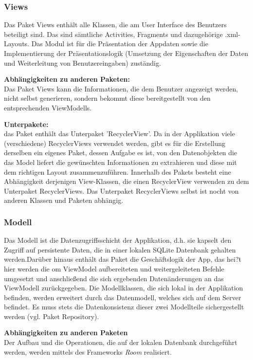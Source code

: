 \documentclass[11pt,a4paper]{report}
\begin{document}
\subsubsection{Views}
Das Paket Views enthält alle Klassen, die am User Interface des Benutzers beteiligt sind. Das sind sämtliche Activities, Fragments und dazugehörige .xml-Layouts. Das Modul ist für die Präsentation der Appdaten sowie die Implementierung der Präsentationslogik (Umsetzung der Eigenschaften der Daten und Weiterleitung von Benutzereingaben) zuständig.

\textbf{Abhängigkeiten zu anderen Paketen:}\\
Das Paket Views kann die Informationen, die dem Benutzer angezeigt werden, nicht selbst generieren, sondern bekommt diese bereitgestellt von den entsprechenden ViewModells.

\textbf{Unterpakete:}\\
das Paket enthält das Unterpaket 'RecyclerView'. Da in der Applikation viele (verschiedene) RecyclerViews verwendet werden, gibt es für die Erstellung derselben ein eigenes Paket, dessen Aufgabe es ist, von den Datenobjekten die das Model liefert die gewünschten Informationen zu extrahieren und diese mit dem richtigen Layout zusammenzuführen. Innerhalb des Pakets besteht eine Abhängigkeit derjenigen View-Klassen, die einen RecyclerView verwenden zu dem Unterpaket RecyclerViews. Das Unterpaket RecyclerViews selbst ist nocht von anderen Klassen und Paketen abhängig.

\subsubsection{Modell}
Das Modell ist die Datenzugriffsschicht der Applikation, d.h. sie kapselt den Zugriff auf persistente Daten, die in einer lokalen SQLite Datenbank gehalten werden.Darüber hinaus enthält das Paket die Geschäftslogik der App, das hei?t hier werden die om ViewModel aufbereiteten und weitergeleiteten Befehle umgesetzt und anschließend die sich ergebenden Datenänderungen an das ViewModell zurückgegeben. Die Modellklassen, die sich lokal in der Applikation befinden, werden erweitert durch das Datenmodell, welches sich auf dem Server befindet. Es muss stets die Datenkonsistenz dieser zwei Modellteile sichergestellt werden (vgl. Paket Repository).

\textbf{Abhängigkeiten zu anderen Paketen}\\
Der Aufbau und die Operationen, die auf der lokalen Datenbank durchgeführt werden, werden mittels des Frameworks \textit{Room} realisiert.
\end{document}
